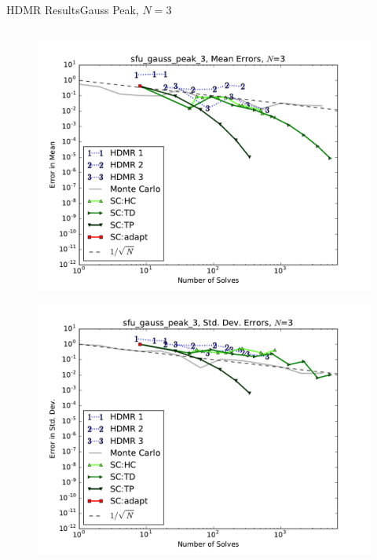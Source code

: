 \documentclass{beamer}
\begin{document}
\begin{frame}{HDMR Results}{Gauss Peak, $N=3$}
\begin{columns}
\begin{column}{0.5\textwidth}
\begin{figure}[h!]
          \includegraphics[width=0.8\linewidth]{anlmodels/sfu_gauss_peak_3_mean_errs}
        \end{figure}
        \vspace{-20pt}
        \begin{figure}[h!]
          \centering
          \includegraphics[width=0.8\linewidth]{anlmodels/sfu_gauss_peak_3_variance_errs}
        \end{figure}
   \end{column}
 \end{columns}
\end{frame}
\end{document}
